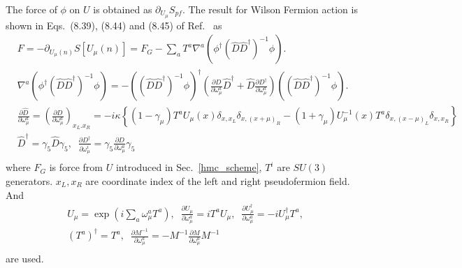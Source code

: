 The force of $\phi$ on $U$ is obtained as $\partial _{U_{\mu}}S_{pf}$. The result for Wilson Fermion action is shown in Eqs.~(8.39), (8.44) and (8.45) of Ref.~\cite{latticeqcdbook2010} as
\begin{equation}
\begin{split}
&F=-\partial _{U_{\mu}(n)}S[U_{\mu}(n)]=F_G-\sum _a T^a \nabla ^a \left(\phi ^{\dagger}\left(\hat{D}\hat{D}^{\dagger}\right)^{-1}\phi\right).\\
&\nabla ^a \left(\phi ^{\dagger}\left(\hat{D}\hat{D}^{\dagger}\right)^{-1}\phi\right) = -\left(\left(\hat{D}\hat{D}^{\dagger}\right)^{-1}\phi\right)^{\dagger}\left(\frac{\partial D}{\partial \omega _{\mu}^a}\hat{D}^{\dagger}+\hat{D}\frac{\partial D^{\dagger}}{\partial \omega _{\mu}^a}\right)\left(\left(\hat{D}\hat{D}^{\dagger}\right)^{-1}\phi\right).\\
&\frac{\partial \hat{D}}{\partial {\omega _{\mu}^a}}=\left(\frac{\partial D}{\partial {\omega _{\mu}^a}}\right)_{x_L.x_R}=-i\kappa \left\{(1-\gamma _{\mu})T^aU_{\mu}(x)\delta _{x,x_L}\delta _{x,(x+\mu)_R}-(1+\gamma _{\mu})U_{\mu}^{-1}(x)T^a\delta _{x,(x-\mu)_L}\delta _{x,x_R} \right\} \\
&\hat{D}^{\dagger} = \gamma _5 \hat{D} \gamma _5, \;\;\frac{\partial D^{\dagger}}{\partial \omega _{\mu}^i}=\gamma _5 \frac{\partial D}{\partial \omega _{\mu}^a} \gamma _5\\
\end{split}
\end{equation}
where $F_G$ is force from $U$ introduced in Sec.~\ref{hmc_scheme}, $T^i$ are $SU(3)$ generators. $x_L,x_R$ are coordinate index of the left and right pseudofermion field. And
\begin{equation}
\begin{split}
&U_{\mu}=\exp (i\sum _a \omega _{\mu}^a T^a),\;\;\frac{\partial U_{\mu}}{\partial \omega_{\mu}^a}=iT^aU_{\mu},\;\;\frac{\partial U^{\dagger}_{\mu}}{\partial \omega_{\mu}^a}=-iU^{\dagger}_{\mu}T^a,\\
&\left(T^a\right)^{\dagger}=T^a,\;\;\frac{\partial M^{-1}}{\partial \omega _{\mu}^a}=-M^{-1}\frac{\partial M}{\partial \omega _{\mu}^a}M^{-1}\\
\end{split}
\end{equation}
are used.

